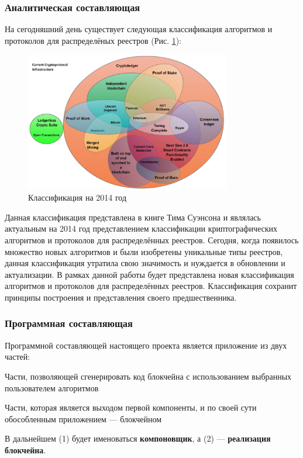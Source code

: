 \subsubsection{Аналитическая составляющая}
На сегодняшний день существует следующая классификация алгоритмов и протоколов
для распределёных реестров (Рис. \ref{2014protocol}):

\begin{figure}[h!]
    \centering
    \includegraphics[width=0.8\textwidth]{./images/current_protocols}
    \caption{Классификация на 2014 год \cite{TimSwanson2014}}\label{2014protocol}
\end{figure}

Данная классификация представлена в книге Тима Суэнсона \cite{TimSwanson2014} и
являлась актуальным на 2014 год представлением классификации криптографических
алгоритмов и протоколов для распределённых реестров. Сегодня, когда появилось
множество новых алгоритмов и были изобретены уникальные типы реестров, данная
классификация утратила свою значимость и нуждается в обновлении и
актуализации. В рамках данной работы будет представлена новая классификация
алгоритмов и протоколов для распределённых реестров. Классификация сохранит
принципы построения и представления своего предшественника.

\subsubsection{Программная составляющая}
Программной составляющей настоящего проекта является приложение из двух частей:
\begin{my_enumerate}
    \item Части, позволяющей сгенерировать код блокчейна с использованием выбранных
          пользователем алгоритмов
    \item Части, которая является выходом первой компоненты, и по своей сути обособленным приложением --- блокчейном
\end{my_enumerate}
В дальнейшем (1) будет именоваться \textbf{компоновщик}, а (2) --- \textbf{реализация блокчейна}. 

